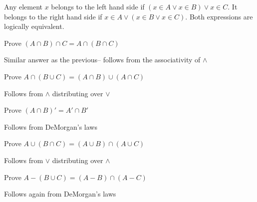 \answer 
Any element $x$ belongs to the left hand side if $(x \in A \vee x \in B) \vee x \in C$. It belongs to the right hand side if $x \in A \vee (x \in B \vee x \in C)$. Both expressions are logically equivalent.


\exercise
Prove $(A \cap B) \cap C = A \cap (B \cap C)$

\answer 
Similar answer as the previous-- follows from the associativity of $\wedge$


\exercise
Prove $A \cap (B \cup C) = (A \cap B) \cup (A \cap C)$

\answer
Follows from $\wedge$ distributing over $\vee$


\exercise
Prove $(A \cap B)' = A' \cap B'$

\answer
Follows from DeMorgan's laws


\exercise
Prove $A \cup (B \cap C) = (A \cup B) \cap (A \cup C)$

\answer
Follows from $\vee$ distributing over $\wedge$


\exercise
Prove $A - (B \cup C) = (A - B) \cap (A - C)$

\answer
Follows again from DeMorgan's laws
